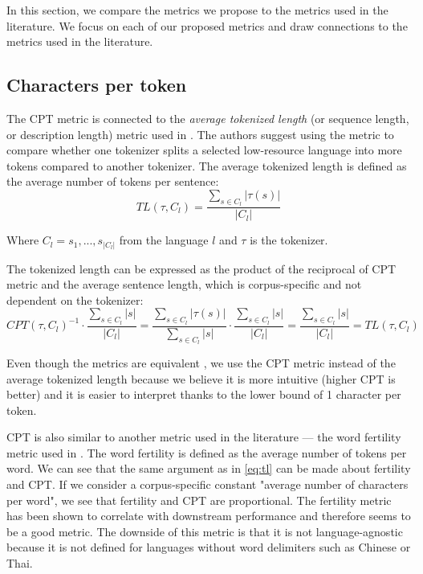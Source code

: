 In this section, we compare the metrics we propose to the metrics used in the literature. We focus on each of our proposed metrics and draw connections to the metrics used in the literature.

\subsection{Characters per token}

The CPT metric is connected to the \textit{average tokenized length} (or sequence length, or description length) metric used in \citet{chung_improving_2020,liang_xlm-v_2023}. The authors suggest using the metric to compare whether one tokenizer splits a selected low-resource language into more tokens compared to another tokenizer. The average tokenized length is defined as the average number of tokens per sentence: 
\begin{equation}
\label{eq:tl_def}
    TL(\tau, C_l) = \frac{\sum_{s \in C_l}|\tau(s)|}{|C_l|}
\end{equation}

Where $C_l = {s_1, ..., s_{|C_l|}}$ from the language $l$ and $\tau$ is the tokenizer.

The tokenized length can be expressed as the product of the reciprocal of CPT metric and the average sentence length, which is corpus-specific and not dependent on the tokenizer:
\begin{equation}
\label{eq:tl}
    CPT(\tau, C_l)^{-1} \cdot \frac{\sum_{s \in C_l}|s|}{|C_l|} = \frac{\sum_{s \in C_l}|\tau(s)|}{\sum_{s \in C_l}|s|} \cdot \frac{\sum_{s \in C_l}|s|}{|C_l|} = \frac{\sum_{s \in C_l}|s|}{|C_l|} = TL(\tau, C_l)
\end{equation}

Even though the metrics are equivalent , we use the CPT metric instead of the average tokenized length because we believe it is more intuitive (higher CPT is better) and it is easier to interpret thanks to the lower bound of 1 character per token.

CPT is also similar to another metric used in the literature --- the word fertility metric used in \citet{rust_how_2021}. The word fertility is defined as the average number of tokens per word. We can see that the same argument as in \autoref{eq:tl} can be made about fertility and CPT. If we consider a corpus-specific constant "average number of characters per word", we see that fertility and CPT are proportional. The fertility metric has been shown to correlate with downstream performance and therefore seems to be a good metric. The downside of this metric is that it is not language-agnostic because it is not defined for languages without word delimiters such as Chinese or Thai.

